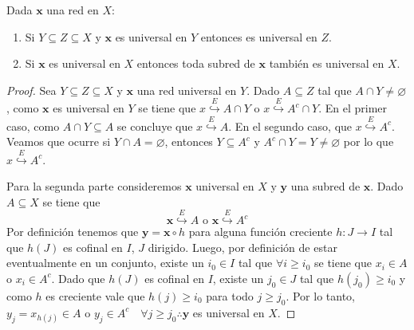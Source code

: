 \documentclass{article}
\theoremstyle{plain}
\theoremstyle{definition}
\newcommand{\evto}[1]{\stackrel{E}{\hookrightarrow} #1}   %
\newenvironment{ejercicio}[1]{\begin{trivlist}
\item[\hskip \labelsep {\bfseries Ejercicio}\hskip \labelsep {\bfseries #1.}]}{\end{trivlist}}
\begin{document}
\begin{ejercicio}{9}
    Dada \( \mathbf{x} \) una red en \( X \):
    \begin{enumerate}
        \item Si \( Y \subseteq Z \subseteq X \) y \( \mathbf{x} \) es universal en \( Y \) entonces es universal en \( Z \).
        \item Si \( \mathbf{x} \) es universal en \( X \) entonces toda subred de \( \mathbf{x} \) también es universal en \( X \).
    \end{enumerate}
\end{ejercicio}
\begin{proof}
    Sea \( Y \subseteq Z \subseteq X \) y \( \mathbf{x} \) una red universal en \( Y \). Dado \( A \subseteq Z \) tal que \( A \cap Y \neq \varnothing \), como \( \mathbf{x} \) es universal en \( Y \)
    se tiene que \( x \evto{A \cap Y} \) o \( x \evto{A^c \cap Y} \). En el primer caso, como \( A \cap Y \subseteq A \) se concluye que \( x \evto{A} \). En el segundo caso, que \( x \evto{A^c} \).
    Veamos que ocurre si \( Y \cap A = \varnothing \), entonces \( Y \subseteq A^c \) y \( A^c \cap Y = Y \neq \varnothing \) por lo que \( x \evto{A^c} \).

    Para la segunda parte consideremos \( \mathbf{x} \) universal en \( X \) y \( \mathbf{y} \) una subred de \( \mathbf{x} \). Dado \( A \subseteq X \) se tiene que \[
        \mathbf{x} \evto{A} \text{ o } \mathbf{x} \evto{A^c}
    \]
    Por definición tenemos que \( \mathbf{y} = \mathbf{x} \circ h \) para alguna función creciente \( h : J \to I \) tal que \( h(J) \) es cofinal en \( I \), \( J \) dirigido. Luego,
    por definición de estar eventualmente en un conjunto, existe un \( i_0 \in I \) tal que \( \forall i \geq i_0 \) se tiene que \( x_i \in A \) o \( x_i \in A^c \).
    Dado que \( h(J) \) es cofinal en \( I \), existe un \( j_0 \in J \) tal que \( h(j_0) \geq i_0 \) y como \( h \) es creciente vale que \( h(j) \geq i_0 \) para todo \( j \geq j_0 \). Por lo tanto,
    \( y_j = x_{h(j)} \in A \) o \( y_j \in A^c \quad \forall j \geq j_0 \therefore \mathbf{y} \) es universal en \( X \).
\end{proof}
\end{document}
